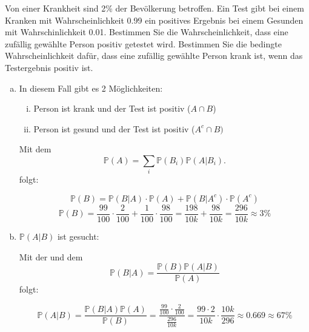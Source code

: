 \begin{uebsp}
\begin{Exercise}[label=ex:1.2]
Von einer Krankheit sind 2\% der Bevölkerung betroffen. Ein Test gibt
bei einem Kranken mit Wahrscheinlichkeit 0.99 ein positives Ergebnis bei
einem Gesunden mit Wahrschinlichkeit 0.01.
\Question
Bestimmen Sie die Wahrscheinlichkeit, dass eine zufällig gewählte Person positiv getestet wird.
\Question
Bestimmen Sie die bedingte Wahrscheinlichkeit dafür, dass eine zufällig gewählte Person krank ist, wenn das Testergebnis positiv ist.
\end{Exercise}
\begin{Answer}
\begin{enumerate}[(a)]
    \item In diesem Fall gibt es 2 Möglichkeiten:
        \begin{enumerate}[i)]
            \item Person ist krank und der Test ist positiv ($A\cap B$)
            \item Person ist gesund und der Test ist positiv ($A^c\cap B)$
        \end{enumerate}
        \begin{uebsp_theory}
        Mit dem 
        \[\mathbb P(A)=\sum_i\mathbb P(B_i)\mathbb P(A|B_i).\]
        folgt:
        \end{uebsp_theory}
        \[\mathbb{P}(B)=\mathbb{P}(B|A)\cdot\mathbb{P}(A)+\mathbb{P}(B|A^c)\cdot\mathbb{P}(A^c)\]
        \[\mathbb{P}(B)=\frac{99}{100}\cdot\frac{2}{100}+\frac{1}{100}\cdot\frac{98}{100}=\frac{198}{10k}+\frac{98}{10k}=\frac{296}{10k}\approx3\%\]
    \item $\mathbb{P}(A|B)$ ist gesucht: 
        \begin{uebsp_theory}
            Mit der  und dem 
            \[\mathbb P(B|A)=\frac{\mathbb P(B)\mathbb P(A|B)}{\mathbb P(A)}\]
            folgt:
        \end{uebsp_theory}
        \[\mathbb{P}(A|B)=\frac{\mathbb{P}(B|A)\mathbb{P}(A)}{\mathbb{P}(B)}=\frac{\frac{99}{100}\cdot\frac{2}{100}}{\frac{296}{10k}}=\frac{99\cdot 2}{10k}\cdot\frac{10k}{296}\approx 0.669\approx 67\%\]

\end{enumerate}
\end{Answer}
\end{uebsp}
